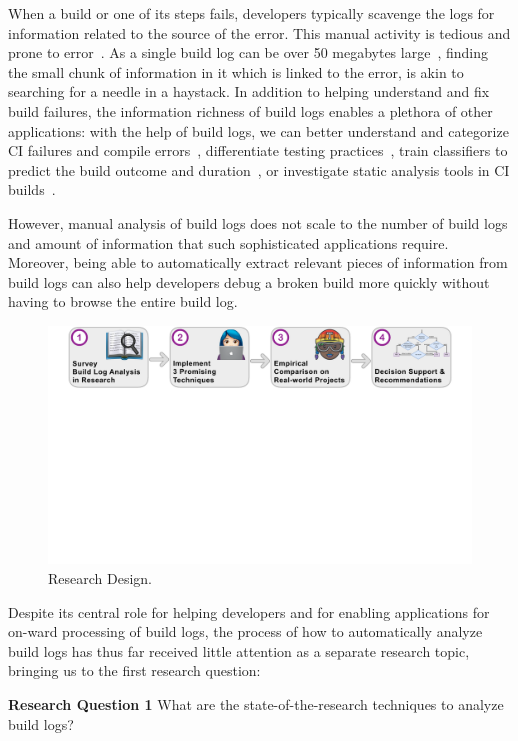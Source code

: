 When a build or one of its steps fails, developers typically
scavenge the logs for information related to the source of the error.
This manual activity is
tedious and prone to error~\cite{santolucito2018statically}.
As a
single build log can be over 50 megabytes large~\cite{beller2017oops},
finding the small chunk of information in it which is linked to the error,
is akin to searching for a
needle in a haystack.
In addition to helping understand and fix build failures, the information
richness of build logs enables a plethora of other applications: with
the help of
build logs, we can better understand and categorize CI
failures and compile
errors~\cite{islam2017insights,seo2014programmers}, differentiate
testing practices~\cite{orellana2017differences,vassallo2017a-tale},
train classifiers to predict the build outcome and
duration~\cite{ni2017cost,bisong2017built,machalica2019predictive}, or
investigate static analysis tools in CI
builds~\cite{zampetti2017open}.

However, manual analysis of build logs does not
scale to the number of build logs and amount of information that such
sophisticated applications require.
Moreover, being able to
automatically extract relevant pieces of information from build logs
can also help
developers debug a broken build more quickly without having to browse
the entire build log.

\begin{figure}[htb]
	\centering
	\includegraphics[width=\textwidth, trim={1.2cm 10.5cm 1.2cm 0cm},
	clip]{img/overview.pdf}
	\caption{Research Design.}
	\label{fig:overview}
\end{figure}

Despite its central role for helping developers and for enabling
applications for on-ward processing of build logs,
the process of how to
automatically analyze build logs has thus far received little
attention as a separate research topic, bringing us to the first
research question:
\begin{simplebox}[minipage boxed title*=-5cm]{\textbf{Research Question
1}}
What are the state-of-the-research techniques to analyze build logs?
\end{simplebox}

